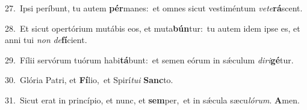 {\numbfont\textcolor{\numbcolor}{27.}}~Ipsi períbunt, tu autem \textbf{pér}\-manes:~\star et omnes sicut vestiméntum \textit{ve}\-\textit{te}\textbf{rá}scent.\par
{\numbfont\textcolor{\numbcolor}{28.}}~Et sicut opertórium mutábis eos, et muta\-\textbf{bún}\-tur:~\star tu autem idem ipse es, et anni tui \textit{non} \textit{de}\-\textbf{fí}cient.\par
{\numbfont\textcolor{\numbcolor}{29.}}~Fílii servórum tuórum habi\-\textbf{tá}\-bunt:~\star et semen eórum in sǽculum \textit{di}\-\textit{ri}\textbf{gé}tur.\par
{\numbfont\textcolor{\numbcolor}{30.}}~Glória Patri, et \textbf{Fí}\-lio,~\star et Spirí\-\textit{tu}\-\textit{i} \textbf{Sanc}\-to.\par
{\numbfont\textcolor{\numbcolor}{31.}}~Sicut erat in princípio, et nunc, et \textbf{sem}\-per,~\star et in sǽcula sæcu\-\textit{ló}\-\textit{rum}. \textbf{A}\-men.\par
